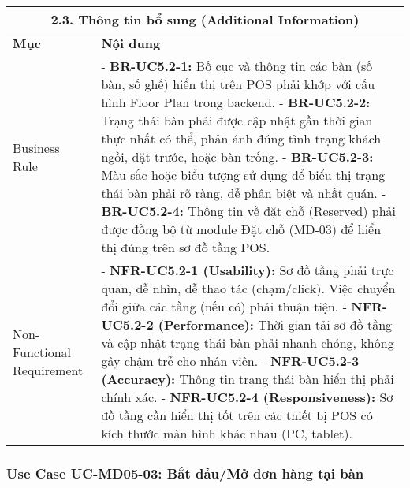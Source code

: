 \begin{longtable}{|m{4cm}|p{11cm}|}
\hline
\multicolumn{2}{|c|}{\textbf{2.3. Thông tin bổ sung (Additional Information)}} \\
\hline
\textbf{Mục} & \textbf{Nội dung} \\
\hline
Business Rule & - \textbf{BR-UC5.2-1:} Bố cục và thông tin các bàn (số bàn, số ghế) hiển thị trên POS phải khớp với cấu hình Floor Plan trong backend. \newline - \textbf{BR-UC5.2-2:} Trạng thái bàn phải được cập nhật gần thời gian thực nhất có thể, phản ánh đúng tình trạng khách ngồi, đặt trước, hoặc bàn trống. \newline - \textbf{BR-UC5.2-3:} Màu sắc hoặc biểu tượng sử dụng để biểu thị trạng thái bàn phải rõ ràng, dễ phân biệt và nhất quán. \newline - \textbf{BR-UC5.2-4:} Thông tin về đặt chỗ (Reserved) phải được đồng bộ từ module Đặt chỗ (MD-03) để hiển thị đúng trên sơ đồ tầng POS. \\
\hline
Non-Functional Requirement & - \textbf{NFR-UC5.2-1 (Usability):} Sơ đồ tầng phải trực quan, dễ nhìn, dễ thao tác (chạm/click). Việc chuyển đổi giữa các tầng (nếu có) phải thuận tiện. \newline - \textbf{NFR-UC5.2-2 (Performance):} Thời gian tải sơ đồ tầng và cập nhật trạng thái bàn phải nhanh chóng, không gây chậm trễ cho nhân viên. \newline - \textbf{NFR-UC5.2-3 (Accuracy):} Thông tin trạng thái bàn hiển thị phải chính xác. \newline - \textbf{NFR-UC5.2-4 (Responsiveness):} Sơ đồ tầng cần hiển thị tốt trên các thiết bị POS có kích thước màn hình khác nhau (PC, tablet). \\
\hline
\end{longtable}

\subsubsection{Use Case UC-MD05-03: Bắt đầu/Mở đơn hàng tại bàn}

